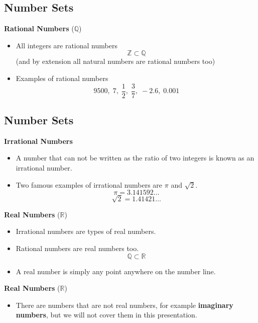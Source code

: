 \documentclass[11pt,a4paper,titlepage,oneside,openany]{article}
\numberwithin{equation}{section}
\numberwithin{algorithm}{section}
\numberwithin{figure}{section}
\numberwithin{table}{section}
\begin{document}
{%

\subsection{Number Sets}

\textbf{Rational Numbers} ($\mathbb{Q}$)
\begin{itemize}
\item All integers are rational numbers 
\[ \mathbb{Z}  \subset \mathbb{Q}\]
(and by extension all natural numbers are rational numbers too)
\item Examples of rational numbers
\[ 9500,\;7,\; \frac{1}{2} ,\; \frac{3}{7},\; -2.6 ,\; 0.001\] 
\end{itemize}


\subsection{Number Sets}

\textbf{Irrational Numbers} 
\begin{itemize}
\item A number that can not be written as the ratio of two integers is known as an irrational number.
\item Two famous examples of irrational numbers are $\pi$ and $\sqrt{2}$. 
\[\pi = 3.141592\ldots\]
\[\sqrt{2} = 1.41421\ldots\]
\end{itemize}


\textbf{Real Numbers} ($\mathbb{R}$)
\begin{itemize}
\item Irrational numbers are types of real numbers.
\item Rational numbers are real numbers too.
\[ \mathbb{Q}  \subset \mathbb{R}\]

\item A real number is simply any point anywhere on the number line.
\end{itemize}


\textbf{Real Numbers} ($\mathbb{R}$)
\begin{itemize}
\item There are numbers that are not real numbers, for example \textbf{imaginary numbers}, but we will not cover them in this presentation.
\end{itemize}




}
\end{document}
